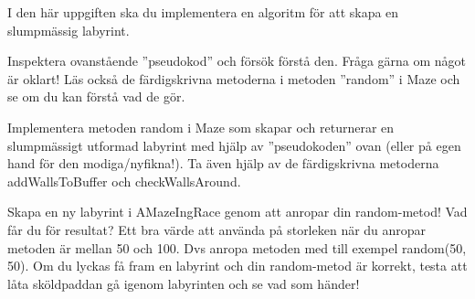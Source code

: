 \Task I den här uppgiften ska du implementera en algoritm för att skapa en slumpmässig labyrint.

\Subtask Inspektera ovanstående ''pseudokod'' och försök förstå den. Fråga gärna om något är oklart! Läs också de färdigskrivna metoderna i metoden ''random'' i Maze och se om du kan förstå vad de gör.

\Subtask Implementera metoden random i Maze som skapar och returnerar en slumpmässigt utformad labyrint med hjälp av ''pseudokoden'' ovan (eller på egen hand för den modiga/nyfikna!). Ta även hjälp av de färdigskrivna metoderna addWallsToBuffer och checkWallsAround.

\Subtask Skapa en ny labyrint i AMazeIngRace genom att anropar din random-metod! Vad får du för resultat? Ett bra värde att använda på storleken när du anropar metoden är mellan 50 och 100. Dvs anropa metoden med till exempel random(50, 50). Om du lyckas få fram en labyrint och din random-metod är korrekt, testa att låta sköldpaddan gå igenom labyrinten och se vad som händer!
    
